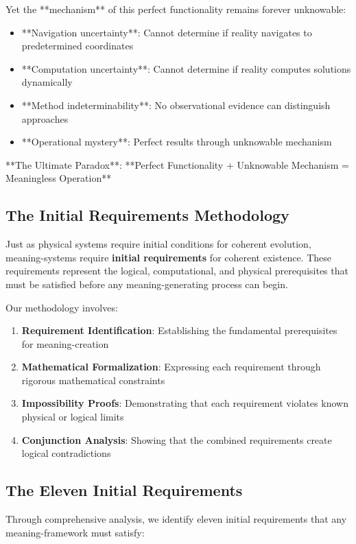 \documentclass[12pt,a4paper]{article}
\begin{document}
Yet the **mechanism** of this perfect functionality remains forever unknowable:
\begin{itemize}
\item **Navigation uncertainty**: Cannot determine if reality navigates to predetermined coordinates
\item **Computation uncertainty**: Cannot determine if reality computes solutions dynamically
\item **Method indeterminability**: No observational evidence can distinguish approaches
\item **Operational mystery**: Perfect results through unknowable mechanism
\end{itemize}

**The Ultimate Paradox**: **Perfect Functionality + Unknowable Mechanism = Meaningless Operation**

\subsection{The Initial Requirements Methodology}

Just as physical systems require initial conditions for coherent evolution, meaning-systems require \textbf{initial requirements} for coherent existence. These requirements represent the logical, computational, and physical prerequisites that must be satisfied before any meaning-generating process can begin.

Our methodology involves:
\begin{enumerate}
\item \textbf{Requirement Identification}: Establishing the fundamental prerequisites for meaning-creation
\item \textbf{Mathematical Formalization}: Expressing each requirement through rigorous mathematical constraints
\item \textbf{Impossibility Proofs}: Demonstrating that each requirement violates known physical or logical limits
\item \textbf{Conjunction Analysis}: Showing that the combined requirements create logical contradictions
\end{enumerate}

\subsection{The Eleven Initial Requirements}

Through comprehensive analysis, we identify eleven initial requirements that any meaning-framework must satisfy:
\end{document}
